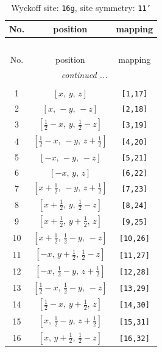 \documentclass[fleqn,8pt]{jsarticle}
\begin{document}
\begin{longtable}{ccc}
\caption{Wyckoff site: {\tt 16g}, site symmetry: {\tt 11'}}
 \\
 \hline \hline
No. & position & mapping \\ \hline \endfirsthead

\multicolumn{2}{l}{\tablename\ \thetable{}} \\
 \hline \hline
No. & position & mapping \\ \hline \endhead

 \hline \hline
\multicolumn{2}{r}{\footnotesize\it continued ...} \\ \endfoot

 \hline \hline
\multicolumn{2}{r}{} \\ \endlastfoot

1 & $\left[ x,\, y,\, z \right]$ & {\tt [1,17]} \\ \hline
2 & $\left[ x,\, - y,\, - z \right]$ & {\tt [2,18]} \\ \hline
3 & $\left[ \frac{1}{2} - x,\, y,\, \frac{1}{2} - z \right]$ & {\tt [3,19]} \\ \hline
4 & $\left[ \frac{1}{2} - x,\, - y,\, z + \frac{1}{2} \right]$ & {\tt [4,20]} \\ \hline
5 & $\left[ - x,\, - y,\, - z \right]$ & {\tt [5,21]} \\ \hline
6 & $\left[ - x,\, y,\, z \right]$ & {\tt [6,22]} \\ \hline
7 & $\left[ x + \frac{1}{2},\, - y,\, z + \frac{1}{2} \right]$ & {\tt [7,23]} \\ \hline
8 & $\left[ x + \frac{1}{2},\, y,\, \frac{1}{2} - z \right]$ & {\tt [8,24]} \\ \hline
9 & $\left[ x + \frac{1}{2},\, y + \frac{1}{2},\, z \right]$ & {\tt [9,25]} \\ \hline
10 & $\left[ x + \frac{1}{2},\, \frac{1}{2} - y,\, - z \right]$ & {\tt [10,26]} \\ \hline
11 & $\left[ - x,\, y + \frac{1}{2},\, \frac{1}{2} - z \right]$ & {\tt [11,27]} \\ \hline
12 & $\left[ - x,\, \frac{1}{2} - y,\, z + \frac{1}{2} \right]$ & {\tt [12,28]} \\ \hline
13 & $\left[ \frac{1}{2} - x,\, \frac{1}{2} - y,\, - z \right]$ & {\tt [13,29]} \\ \hline
14 & $\left[ \frac{1}{2} - x,\, y + \frac{1}{2},\, z \right]$ & {\tt [14,30]} \\ \hline
15 & $\left[ x,\, \frac{1}{2} - y,\, z + \frac{1}{2} \right]$ & {\tt [15,31]} \\ \hline
16 & $\left[ x,\, y + \frac{1}{2},\, \frac{1}{2} - z \right]$ & {\tt [16,32]} \\
\end{longtable}
\end{document}
